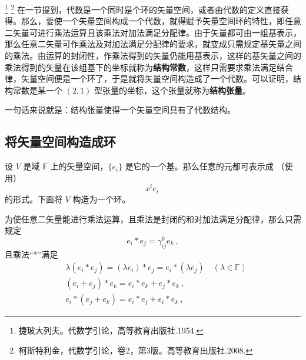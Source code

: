 
\footnote{捷玻大列夫。代数学引论，高等教育出版社.1954.}
\footnote{柯斯特利金，代数学引论，卷2，第3版。高等教育出版社.2008.} 在一节提到，代数是一个同时是个环的矢量空间，或者由代数的定义直接获得。那么，要使一个矢量空间构成一个代数，就得赋予矢量空间环的特性，即任意二矢量可进行乘法运算且该乘法对加法满足分配律。由于矢量都可由一组基表示，那么任意二矢量可作乘法及对加法满足分配律的要求，就变成只需规定基矢量之间的乘法。由运算的封闭性，作乘法得到的矢量仍能用基表示，这样的基矢量之间的乘法得到的矢量在该组基下的坐标就称为\textbf{结构常数}，这样只需要求乘法满足结合律，矢量空间便是一个环了，于是就将矢量空间构造成了一个代数。可以证明，结构常数是某一个 $(2,1)$ 型张量的坐标，这个张量就称为\textbf{结构张量}。 

一句话来说就是：结构张量使得一个矢量空间具有了代数结构。

\subsection{将矢量空间构造成环}
设 $V$ 是域 $\mathbb F$ 上的矢量空间，$\{e_i\}$ 是它的一个基。那么任意的元都可表示成 （使用）
\begin{equation}
x^i e_i~
\end{equation}
的形式。下面将 $V$ 构造为一个环。

为使任意二矢量能进行乘法运算，且乘法是封闭的和对加法满足分配律，那么只需规定
\begin{equation}\label{eq_STAlg_1}
e_i*e_j=\gamma_{ij}^k e_k~,
\end{equation}
且乘法“*”满足
\begin{equation}
\begin{aligned}
&\lambda(e_i*e_j)=(\lambda e_i)*e_j=e_i*(\lambda e_j)\quad (\lambda\in\mathbb F)\\
&(e_i+e_j)*e_k=e_i*e_k+e_j*e_k~,\\
&e_i*(e_j+e_k)=e_i*e_j+e_i*e_k~,
\end{aligned}
\end{equation}

